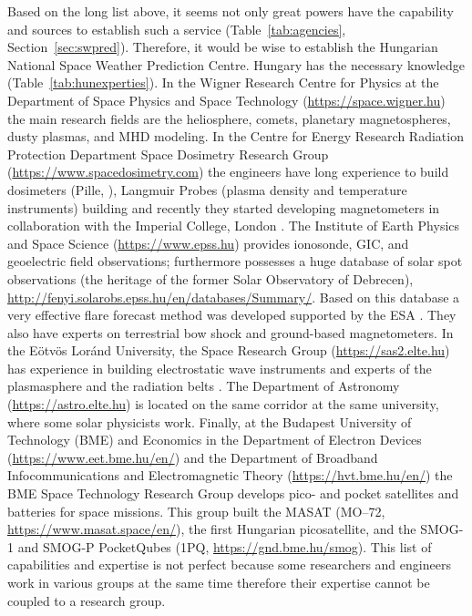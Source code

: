 \documentclass[sn-aps]{sn-jnl}%
\begin{document}
Based on the long list above, it seems not only great powers have the capability and sources to establish such a service (Table~\ref{tab:agencies}, Section~\ref{sec:swpred}). Therefore, it would be wise to establish the Hungarian National Space Weather Prediction Centre. Hungary has the necessary knowledge (Table~\ref{tab:hunexperties}). In the Wigner Research Centre for Physics at the Department of Space Physics and Space Technology (\url{https://space.wigner.hu}) the main research fields are the heliosphere, comets, planetary magnetospheres, dusty plasmas, and MHD modeling. In the Centre for Energy Research Radiation Protection Department Space Dosimetry Research Group (\url{https://www.spacedosimetry.com}) the engineers have long experience to build dosimeters (Pille, \cite{apathy02:_dose_hungar_pille_tld}), Langmuir Probes (plasma density and temperature instruments) building and recently they started developing magnetometers in collaboration with the Imperial College, London \cite{hirn22:_charac_radmag_radcub_iod}. The Institute of Earth Physics and Space Science (\url{https://www.epss.hu}) provides ionosonde, GIC, and geoelectric field observations; furthermore possesses a huge database of solar spot observations (the heritage of the former Solar Observatory of Debrecen), \url{http://fenyi.solarobs.epss.hu/en/databases/Summary/}. Based on this database a very effective flare forecast method was developed supported by the ESA \cite{korsos14:_pre_dynam_sunsp_group,korsos15:_dynam_precur_flares_activ_region_noaa}. They also have experts on terrestrial bow shock and ground-based magnetometers. In the E{\"o}tv{\"o}s Lor{\'a}nd University, the Space Research Group (\url{https://sas2.elte.hu}) has experience in building electrostatic wave instruments and experts of the plasmasphere and the radiation belts \cite{lichtenberger08:_autom_whist_detec_analy,lichtenberger13}. The Department of Astronomy (\url{https://astro.elte.hu}) is located on the same corridor at the same university, where some solar physicists work. Finally, at the Budapest University of Technology (BME) and Economics in the Department of Electron Devices (\url{https://www.eet.bme.hu/en/}) and the Department of Broadband Infocommunications and Electromagnetic Theory (\url{https://hvt.bme.hu/en/}) the BME Space Technology Research Group develops pico- and pocket satellites and batteries for space missions. This group built the MASAT (MO–72, \url{https://www.masat.space/en/}), the first Hungarian picosatellite, and the SMOG-1 and SMOG-P PocketQubes (1PQ, \url{https://gnd.bme.hu/smog}). This list of capabilities and expertise is not perfect because some researchers and engineers work in various groups at the same time therefore their expertise cannot be coupled to a research group.
\end{document}

